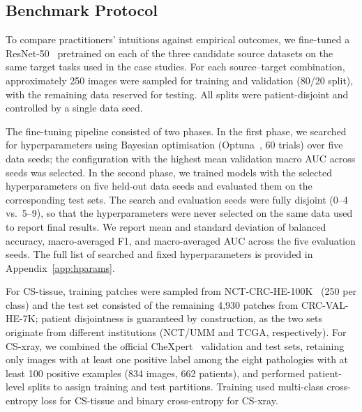 \subsection{Benchmark Protocol}
\label{sec:benchmark}

To compare practitioners' intuitions against empirical outcomes, we fine-tuned a ResNet-50~\cite{he2016} pretrained on each of the three candidate source datasets on the same target tasks used in the case studies. For each source--target combination, approximately 250 images were sampled for training and validation (80/20 split), with the remaining data reserved for testing. All splits were patient-disjoint and controlled by a single data seed.

The fine-tuning pipeline consisted of two phases. In the first phase, we searched for hyperparameters using Bayesian optimisation (Optuna~\cite{akiba2019}, 60 trials) over five data seeds; the configuration with the highest mean validation macro AUC across seeds was selected. In the second phase, we trained models with the selected hyperparameters on five held-out data seeds and evaluated them on the corresponding test sets. The search and evaluation seeds were fully disjoint (0--4 vs.\ 5--9), so that the hyperparameters were never selected on the same data used to report final results. We report mean and standard deviation of balanced accuracy, macro-averaged F1, and macro-averaged AUC across the five evaluation seeds. The full list of searched and fixed hyperparameters is provided in Appendix~\ref{app:hparams}.

For CS-tissue, training patches were sampled from NCT-CRC-HE-100K~\cite{kather2019} (250 per class) and the test set consisted of the remaining 4,930 patches from CRC-VAL-HE-7K; patient disjointness is guaranteed by construction, as the two sets originate from different institutions (NCT/UMM and TCGA, respectively). For CS-xray, we combined the official CheXpert~\cite{irvin2019} validation and test sets, retaining only images with at least one positive label among the eight pathologies with at least 100 positive examples (834 images, 662 patients), and performed patient-level splits to assign training and test partitions. Training used multi-class cross-entropy loss for CS-tissue and binary cross-entropy for CS-xray.
